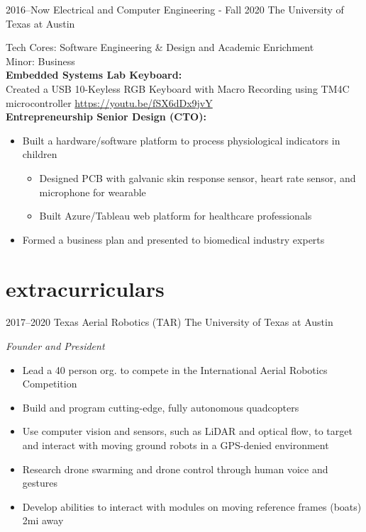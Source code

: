 \documentclass[]{friggeri-cv} %
\begin{document}
\begin{entrylist}

	\entry
	{2016--Now}
	{Electrical and Computer Engineering - Fall 2020}
	{The University of Texas at Austin}
	{
		Tech Cores: Software Engineering \& Design and Academic Enrichment \\ 
		Minor: Business \\
		\textbf{Embedded Systems Lab Keyboard:} \\ 
			Created a USB 10-Keyless RGB Keyboard with Macro Recording using TM4C microcontroller \href{https://youtu.be/fSX6dDx9jvY}{https://youtu.be/fSX6dDx9jvY} \\
		\textbf{Entrepreneurship Senior Design (CTO):} 
		\begin{itemize}
			\item Built a hardware/software platform to process physiological indicators in children
			\begin{itemize}
				\item Designed PCB with galvanic skin response sensor, heart rate sensor, and microphone for wearable
				\item Built Azure/Tableau web platform for healthcare professionals 
			\end{itemize}
			\item Formed a business plan and presented to biomedical industry experts 
		\end{itemize}
	}
	
\end{entrylist}

\vspace{-15pt}
\section{extracurriculars}
\vspace{-10pt}

\begin{entrylist}

	\entry
	{2017--2020}
	{Texas Aerial Robotics (TAR)}
	{The University of Texas at Austin}
	{
	\emph{Founder and President}
		\begin{itemize}
			\item Lead a 40 person org. to compete in the International Aerial Robotics Competition
			\item Build and program cutting-edge, fully autonomous quadcopters
			\item Use computer vision and sensors, such as LiDAR and optical flow, to target and interact with moving ground robots in a GPS-denied environment
			\item Research drone swarming and drone control through human voice and gestures
			\item Develop abilities to interact with modules on moving reference frames (boats) 2mi away
		\end{itemize}
	}

\end{entrylist}
\end{document}
